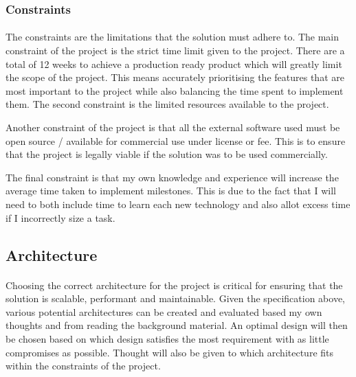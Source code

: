 \documentclass[12pt, conference, final, a4paper, onecolumn, compsoc]{IEEEtran}
\begin{document}
    \subsubsection*{Constraints}
    \paragraph{}

    The constraints are the limitations that the solution must adhere to. The
    main constraint of the project is the strict time limit given to the
    project. There are a total of 12 weeks to achieve a production ready product
    which will greatly limit the scope of the project. This means accurately
    prioritising the features that are most important to the project while also
    balancing the time spent to implement them. The second constraint is the
    limited resources available to the project.


    Another constraint of the project is that all the external software used
    must be open source / available for commercial use under license or fee.
    This is to ensure that the project is legally viable if the solution was to
    be used commercially.

    The final constraint is that my own knowledge and experience will increase
    the average time taken to implement milestones. This is due to the fact that
    I will need to both include time to learn each new technology and also allot
    excess time if I incorrectly size a task.


    \subsection*{Architecture}

    \paragraph{}
    Choosing the correct architecture for the project is critical for ensuring
    that the solution is scalable, performant and maintainable. Given the
    specification above, various potential architectures can be created and
    evaluated based my own thoughts and from reading the background material. An
    optimal design will then be chosen based on which design satisfies the most
    requirement with as little compromises as possible. Thought will also be
    given to which architecture fits within the constraints of the project.
\end{document}
